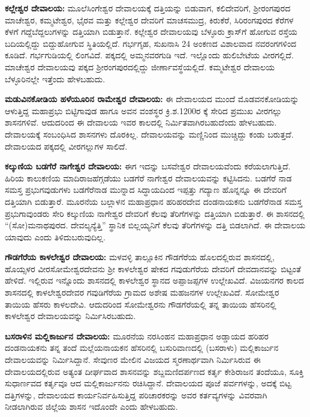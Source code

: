 \textbf{ಕಲ್ಲೇಶ್ವರ ದೇವಾಲಯ: } ಮೂಲೆಸಿಂಗೇಶ್ವರ ದೇವಾಲಯಕ್ಕೆ ದತ್ತಿಯನ್ನು ಬಿಡುವಾಗ, ಕಲಿದೇವರಿಗೆ, ಶ‍್ರೀರಂಗಪುರದ ಮಾಚೇಶ್ವರ, ಕಮ್ಮಟೇಶ್ವರ, ಭೈರವ ಮತ್ತು ಕಲ್ಲೇಶ್ವರ ದೇವರಿಗೆ ಮಾಚಸಮುದ್ರ, ಕಿರುಕೆರೆ, ಸಿರಿರಂಗಪುರದ ಕೆರೆಗಳ ಕೆಳಗೆ ಗದ್ದೆಬೆದ್ದಲುಗಳನ್ನು ದತ್ತಿಯಾಗಿ ಬಿಡುತ್ತಾನೆ. ಕಲ್ಲೇಶ್ವರ ದೇವಾಲಯವು ಬೆಳ್ಳೂರು ಕ್ರಾಸ್​ಗೆ ಹೋಗುವ ರಸ್ತೆಯ ಬದಿಯಲ್ಲಿದ್ದು ಬಿದ್ದುಹೋಗುವ ಸ್ಥಿತಿಯಲ್ಲಿದೆ. ಗರ್ಭಗೃಹ, ಸುಖನಾಸಿ 24 ಅಂಕಣದ ವಿಶಾಲವಾದ ನವರಂಗಗಳಿಂದ ಕೂಡಿದೆ. ಗರ್ಭಗುಡಿಯಲ್ಲಿ ಲಿಂಗವಿದೆ. ಪಕ್ಕದಲ್ಲಿ ಅಮ್ಮನವರಗುಡಿ ಇದೆ. ಇಲ್ಲೊಂದು ಹುಲಿಬೇಟೆಯ ವೀರಗಲ್ಲಿದೆ. ಮಾಚೇಶ್ವರ ದೇವಾಲಯವು ಪಕ್ಕದ ಶ‍್ರೀರಂಗಪುರದಲ್ಲಿದ್ದು ಜೀರ್ಣಾವಸ್ಥೆಯಲ್ಲಿದೆ. ಕಮ್ಮಟೇಶ್ವರ ದೇವಾಲಯ ಬೆಳ್ಳೂರಿನಲ್ಲೇ ಇತ್ತೆಂದು ಹೇಳಬಹುದು.

\textbf{ಮಡುವಿನಕೋಡಿಯ ಹಳೆಯೂರಿನ ರಾಮೇಶ್ವರ ದೇವಾಲಯ:} ಈ ದೇವಾಲಯದ ಮುಂದೆ ಮೊಡವನಕೋಡಿಯನ್ನು ಆಳುತ್ತಿದ್ದ ಮಹಾಪ್ರಭು ಬಿಟ್ಟಿಗಾವುಡ ಹಾಗೂ ಅವನ ವಂಶಸ್ಥರ ಕ್ರಿ.ಶ.1200ರ ಕ್ಕೆ ಸೇರಿದ ಪ್ರಮುಖ ವೀರಗಲ್ಲು ಶಾಸನಗಳಿವೆ. ಆದುದರಿಂದ ಈ ದೇವಾಲಯ ಇವರ ಕಾಲದಲ್ಲಿ ನಿರ್ಮಿತವಾಗಿರಬಹುದೆಂದು ಹೇಳಬಹುದು. ದೇವಾಲಯಕ್ಕೆ ಸಂಬಂಧಿಸಿದ ಶಾಸನಗಳು ದೊರಕಿಲ್ಲ. ದೇವಾಲಯವನ್ನು ಮಣ್ಣಿನಿಂದ ಮುಚ್ಚಿದ್ದು ಕಂಡು ಬರುತ್ತದೆ. ದೇವಾಲಯದ ಪಕ್ಕದಲ್ಲಿ ವೀರಗಲ್ಲುಗಳ ಸಾಲಿದೆ. 

\textbf{ಕಲ್ಕುಣಿಯ ಬಡಗೆರೆ ನಾಗೇಶ್ವರ ದೇವಾಲಯ:} ಈಗ ಇದನ್ನು ಬಸವೇಶ್ವರ ದೇವಾಲಯವೆಂದು ಕರೆಯಲಾಗುತ್ತಿದೆ. ಹಿರಿಯ ಕಾಲುಕಣಿಯ ಮಾದಿರಾಜಹೆಗ್ಗಡೆಯು ಬಡಗೆರೆ ನಾಗೇಶ್ವರ ದೇವಾಲಯವನ್ನು ಕಟ್ಟಿಸಿದನು. ಬಡಗೆರೆ ನಾಡ ಸಮಸ್ತ ಪ್ರಭುಗವುಡುಗಳು ಬಡಗೆರೆನಾಡ ಮುನ್ನಾದ ಸಿದ್ಧಾಯದಿಂದ ಇಪ್ಪತ್ತು ಗದ್ಯಾಣ ಹೊನ್ನನ್ನೂ ಈ ದೇವರಿಗೆ ದತ್ತಿಯಾಗಿ ಬಿಡುತ್ತಾರೆ. ಮೂರನೆಯ ಬಲ್ಲಾಳನ ಮಹಾಪ್ರಧಾನ ಹರಿಹರದೇವ ದಂಡನಾಯಕನು ಬಡಗೆರೆನಾಡ ಸಮಸ್ತ ಪ್ರಭುಗಾವುಂಡರು ಸೇರಿ ಕಲ್ಕುಣಿಯ ನಾಗೇಶ್ವರ ದೇವರಿಗೆ ಕೆಲವು ತೆರಿಗೆಗಳನ್ನು ದತ್ತಿಯಾಗಿ ಬಿಡುತ್ತಾರೆ. ಈ ಶಾಸನದಲ್ಲಿ “(ಸೋ)ಮನಾಥಪುರದ. ದೇವಲ್ಯನ್ಯೆತ್ತಿ” ಸ್ಥಾನಿಕ ಬಿಲ್ಲಯ್ಯನಿಗೆ ಕೆಲವು ತೆರಿಗೆಗಳನ್ನು ದತ್ತಿ ಬಿಡಲಾಗಿದೆ. ಈ ದೇವಾಲಯ ಯಾವುದು ಎಂದು ತಿಳಿದುಬರುವುದಿಲ್ಲ.

\textbf{ಗೌಡಗೆರೆಯ ಕಾಳಲೇಶ್ವರ ದೇವಾಲಯ:} ಮಳವಳ್ಳಿ ತಾಲ್ಲೂಕಿನ ಗೌಡಗೆರೆಯ ಹೊಲದಲ್ಲಿರುವ ಶಾಸನದಲ್ಲಿ, ಹೊಯ್ಸಳರ ವೀರಸೋಮೇಶ್ವರದೇವನು ಶ‍್ರೀ ಕಾಳಲೇಶ್ವರ ಷೇಕದ ಗವುಡುಗೆರೆಯ ದೇವರಿಗೆ ದೇವದಾನವನ್ನು ಬಿಟ್ಟಂತೆ ಹೇಳಿದೆ. ಇಲ್ಲಿರುವ ಇನ್ನೊಂದು ಶಾಸನದಲ್ಲಿ ಕಾಳಲೇಶ್ವರ ಸ್ಥಾನದ ಅಪ್ಪಾಜಪ್ಪಗಳ ಉಲ್ಲೇಖವಿದೆ. ವಿಜಯನಗರ ಕಾಲದ ಶಾಸನದಲ್ಲಿ ಕಾಳಲೇಶ್ವರದೇವರ ಗವುಡಿಗೆರೆಯ ಗ್ರಾಮದ ಅಶೇಷ ಮಹಜನಗಳ ಉಲ್ಲೇಖವಿದೆ. ಸೋಮೇಶ್ವರ ತಾಯಿಯ ಹೆಸರು ಕಾಳಲದೇವಿ. ಆದುದರಿಂದ ಸೋಮೇಶ್ವರನು ಗೌಡಗೆರೆಯಲ್ಲಿ ತನ್ನ ತಾಯಿಯ ಹೆಸರಿನಲ್ಲಿ ಕಾಳಲೇಶ್ವರ ದೇವಾಲಯವನ್ನು ನಿರ್ಮಿಸಿರಬಹುದು. 

\textbf{ಬಸರಾಳಿನ ಮಲ್ಲಿಕಾರ್ಜುನ ದೇವಾಲಯ:} ಮೂರನೆಯ ನರಸಿಂಹನ ಮಹಾಪ್ರಧಾನ ಅಡ್ಡಾಯದ ಹರಿಹರ ದಂಡನಾಯಕನು ತನ್ನ ತಂದೆ ಮಲ್ಲೆಯನಾಯಕನ ಹೆಸರಿನಲ್ಲಿ ಬಸುರಿವಾಣದಲ್ಲಿ (ಬಸರಾಳು) ಮಲ್ಲಿಕಾರ್ಜುನ ದೇವಾಲಯವನ್ನು ನಿರ್ಮಿಸಿದ್ದಾನೆ. ಸೇವುಣರ ಮೇಲಿನ ವಿಜಯದ ಸ್ಮರಣಾರ್ಥವಾಗಿ ನಿರ್ಮಿಸಿರುವ ಈ ದೇವಾಲಯದಲ್ಲಿರುವ ಅತ್ಯಂತ ದೀರ್ಘವಾದ ಶಾಸನವನ್ನು ಶಬ್ದಮಣಿದರ್ಪಣದ ಕರ್ತೃ ಕೇಶಿರಾಜನ ತಂದೆಯೂ, ಸೂಕ್ತಿ ಸುಧಾರ್ಣವದ ಕರ್ತೃವೂ ಆದ ಮಲ್ಲಿಕಾರ್ಜುನನು ರಚಿಸಿದ್ದಾನೆ. ದೇವಾಲಯದ ಪೂಜೆ ಪರ್ವಗಳನ್ನು, ಅದಕ್ಕೆ ಬಿಟ್ಟ ದತ್ತಿಗಳನ್ನು, ದೇವಾಲಯದ ಕಾರ್ಯನಿರ್ವಹಿಸುತ್ತಿದ್ದ ಪರಿಚಾರಕರನ್ನು ಅವರ ಕರ್ತವ್ಯಗಳನ್ನು ವಿವರವಾಗಿ ನೀಡಲಾಗಿರುವ ಜಿಲ್ಲೆಯ ಶಾಸನ ಇದೊಂದೇ ಎಂದು ಹೇಳಬಹುದು.

